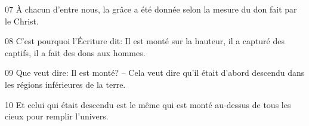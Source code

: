 
07 À chacun d’entre nous, la grâce a été donnée selon la mesure du don fait par le Christ.

08 C’est pourquoi l’Écriture dit: Il est monté sur la hauteur, il a capturé des captifs, il a fait des dons aux hommes.

09 Que veut dire: Il est monté? – Cela veut dire qu’il était d’abord descendu dans les régions inférieures de la terre.

10 Et celui qui était descendu est le même qui est monté au-dessus de tous les cieux pour remplir l’univers.
